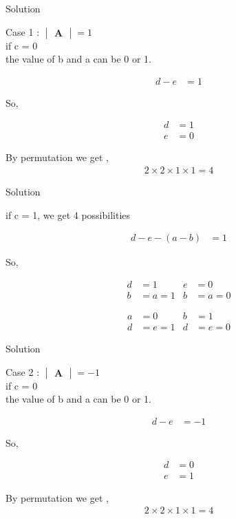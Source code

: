 \documentclass{beamer}
\numberwithin{equation}{section}
\theoremstyle{remark}
\newcommand{\mydet}[1]{\ensuremath{\begin{vmatrix}#1\end{vmatrix}}}
\let\vec\mathbf
\begin{document}
\begin{frame}{Solution}

Case 1 : $\mydet{\vec{A}}=1$ \\

if c = 0 \\
the value of b and a can be 0 or 1.

\begin{align}
d - e &= 1
\end{align}

So,

\begin{align}
d &= 1 \\  
e &= 0
\end{align}

By permutation we get ,\\

\begin{align}
2 \times 2 \times 1 \times 1 = 4
\end{align}

\end{frame}

\begin{frame}{Solution}

if c = 1, we get 4 possibilities

\begin{align}
d - e -(a - b) &= 1
\end{align}

So,

\begin{align}
  d &= 1 & e&=0 \\   
  b&=a=1 & b&=a=0
\end{align}

\begin{align}
  a &= 0 & b&=1 \\   
  d&=e=1 & d&=e=0
\end{align}

\end{frame}

\begin{frame}{Solution}

Case 2 : $\mydet{\vec{A}}= -1$ \\

if c = 0 \\
the value of b and a can be 0 or 1.

\begin{align}
d - e &= -1
\end{align}

So,

\begin{align}
d &= 0 \\  
e &= 1
\end{align}

By permutation we get ,\\

\begin{align}
2 \times 2 \times 1 \times 1 = 4
\end{align}

\end{frame}
\end{document}
